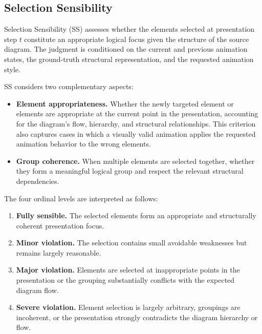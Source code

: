 \documentclass{article} %
\begin{document}
\subsection{Selection Sensibility}
\label{sec:supp_ss}

Selection Sensibility (SS) assesses whether the elements selected at
presentation step $t$ constitute an appropriate logical focus given the
structure of the source diagram. The judgment is conditioned on the current
and previous animation states, the ground-truth structural representation,
and the requested animation style.

SS considers two complementary aspects:

\begin{itemize}
    \item \textbf{Element appropriateness.}
    Whether the newly targeted element or elements are appropriate at the
    current point in the presentation, accounting for the diagram's flow,
    hierarchy, and structural relationships. This criterion also captures
    cases in which a visually valid animation applies the requested animation
    behavior to the wrong elements.

    \item \textbf{Group coherence.}
    When multiple elements are selected together, whether they form a
    meaningful logical group and respect the relevant structural
    dependencies.
\end{itemize}

The four ordinal levels are interpreted as follows:

\begin{enumerate}
    \item[4.] \textbf{Fully sensible.}
    The selected elements form an appropriate and structurally coherent
    presentation focus.

    \item[3.] \textbf{Minor violation.}
    The selection contains small avoidable weaknesses but remains largely
    reasonable.

    \item[2.] \textbf{Major violation.}
    Elements are selected at inappropriate points in the presentation or the
    grouping substantially conflicts with the expected diagram flow.

    \item[1.] \textbf{Severe violation.}
    Element selection is largely arbitrary, groupings are incoherent, or the
    presentation strongly contradicts the diagram hierarchy or flow.
\end{enumerate}
\end{document}
